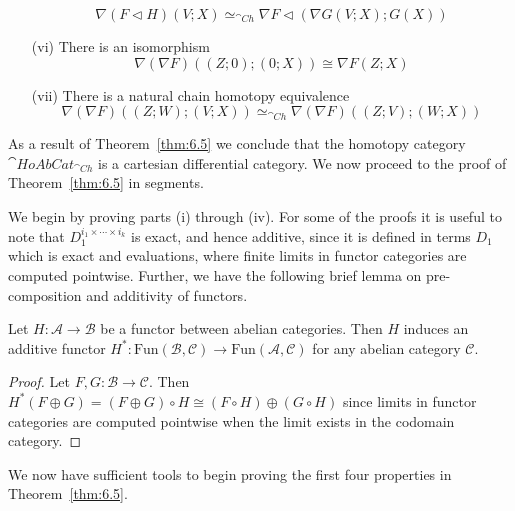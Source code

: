 \begin{thm}[label=thm:6.5]
\begin{itemize}
            \begin{equation*}
                \nabla (F\lhd H)(V;X)\simeq_{\cat{Ch}}\nabla F \lhd (\nabla G(V;X);G(X))
            \end{equation*}
        \item[(vi)] There is an isomorphism 
            \begin{equation*}
                \nabla (\nabla F)((Z;0);(0;X)) \cong \nabla F(Z;X)
            \end{equation*}
        \item[(vii)] There is a natural chain homotopy equivalence 
            \begin{equation*}
                \nabla (\nabla F)((Z;W);(V;X)) \simeq_{\cat{Ch}} \nabla (\nabla F)((Z;V);(W;X))
            \end{equation*}
    \end{itemize}
\end{thm}

As a result of Theorem~\ref{thm:6.5} we conclude that the homotopy category $\cat{HoAbCat}_{\cat{Ch}}$ is a cartesian differential category. We now proceed to the proof of Theorem~\ref{thm:6.5} in segments.


We begin by proving parts (i) through (iv). For some of the proofs it is useful to note that $D_1^{i_1\times \cdots \times i_k}$ is exact, and hence additive, since it is defined in terms $D_1$ which is exact and evaluations, where finite limits in functor categories are computed pointwise. Further, we have the following brief lemma on pre-composition and additivity of functors.

\begin{lem}[label=lem:pre-compAdd]
    Let $H:\mathcal{A}\to \mathcal{B}$ be a functor between abelian categories. Then $H$ induces an additive functor $H^*:\text{Fun}(\mathcal{B},\mathcal{C})\to \text{Fun}(\mathcal{A},\mathcal{C})$ for any abelian category $\mathcal{C}$.
\end{lem}
\begin{proof}
    Let $F,G:\mathcal{B}\to \mathcal{C}$. Then $H^*(F\oplus G) = (F\oplus G)\circ H \cong (F\circ H)\oplus (G\circ H)$ since limits in functor categories are computed pointwise when the limit exists in the codomain category.
\end{proof}

We now have sufficient tools to begin proving the first four properties in Theorem~\ref{thm:6.5}.


